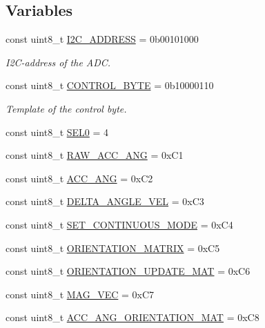\subsection*{\-Variables}
\begin{DoxyCompactItemize}
\item 
const uint8\-\_\-t \hyperlink{namespace_u_s_u_a2db9a5d5bfe7ac01ad7614d2113cdbee}{\-I2\-C\-\_\-\-A\-D\-D\-R\-E\-S\-S} = 0b00101000
\begin{DoxyCompactList}\small\item\em \-I2\-C-\/address of the \-A\-D\-C. \end{DoxyCompactList}\item 
const uint8\-\_\-t \hyperlink{namespace_u_s_u_a2a7d5ce7e6cfea72beb680d46437f83a}{\-C\-O\-N\-T\-R\-O\-L\-\_\-\-B\-Y\-T\-E} = 0b10000110
\begin{DoxyCompactList}\small\item\em \-Template of the control byte. \end{DoxyCompactList}\item 
const uint8\-\_\-t \hyperlink{namespace_u_s_u_af74f2b5c887719077addc33c5986024b}{\-S\-E\-L0} = 4
\item 
const uint8\-\_\-t \hyperlink{namespace_u_s_u_a6bbb473161195a7e10d9f821cece1b04}{\-R\-A\-W\-\_\-\-A\-C\-C\-\_\-\-A\-N\-G} = 0x\-C1
\item 
const uint8\-\_\-t \hyperlink{namespace_u_s_u_a0517f100ec98a93fb28d4ae52a943b19}{\-A\-C\-C\-\_\-\-A\-N\-G} = 0x\-C2
\item 
const uint8\-\_\-t \hyperlink{namespace_u_s_u_acaafc8eff5346d9c529238dd0ceb61a6}{\-D\-E\-L\-T\-A\-\_\-\-A\-N\-G\-L\-E\-\_\-\-V\-E\-L} = 0x\-C3
\item 
const uint8\-\_\-t \hyperlink{namespace_u_s_u_a1f3d4b142078bc61d7dea5676b399d29}{\-S\-E\-T\-\_\-\-C\-O\-N\-T\-I\-N\-U\-O\-U\-S\-\_\-\-M\-O\-D\-E} = 0x\-C4
\item 
const uint8\-\_\-t \hyperlink{namespace_u_s_u_a6bab14d28c02be2a8956e98d18b9b275}{\-O\-R\-I\-E\-N\-T\-A\-T\-I\-O\-N\-\_\-\-M\-A\-T\-R\-I\-X} = 0x\-C5
\item 
const uint8\-\_\-t \hyperlink{namespace_u_s_u_a9d3464edac1b198f5c02658b36d083bb}{\-O\-R\-I\-E\-N\-T\-A\-T\-I\-O\-N\-\_\-\-U\-P\-D\-A\-T\-E\-\_\-\-M\-A\-T} = 0x\-C6
\item 
const uint8\-\_\-t \hyperlink{namespace_u_s_u_a85ca84f12076e3251addb0c96317c83a}{\-M\-A\-G\-\_\-\-V\-E\-C} = 0x\-C7
\item 
const uint8\-\_\-t \hyperlink{namespace_u_s_u_a13f66b9f78d1a3e9778bce391ab41b5e}{\-A\-C\-C\-\_\-\-A\-N\-G\-\_\-\-O\-R\-I\-E\-N\-T\-A\-T\-I\-O\-N\-\_\-\-M\-A\-T} = 0x\-C8

\end{DoxyCompactItemize}
